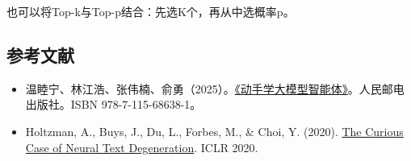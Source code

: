 也可以将Top-k与Top-p结合：先选K个，再从中选概率p。

\FloatBarrier
{}
\hypertarget{ux53c2ux8003ux6587ux732e-75}{%
\subsection{参考文献}\label{ux53c2ux8003ux6587ux732e-75}}

\vspace{0.25em}
\begin{itemize}
\tightlist
\item
  温睦宁、林江浩、张伟楠、俞勇（2025）。\href{https://haa.boyuai.com/}{《动手学大模型智能体》}。人民邮电出版社。ISBN 978-7-115-68638-1。
\item
  Holtzman, A., Buys, J., Du, L., Forbes, M., \& Choi, Y. (2020). \href{https://arxiv.org/abs/1904.09751}{The Curious Case of Neural Text Degeneration}. ICLR 2020.
\end{itemize}

\clearpage
